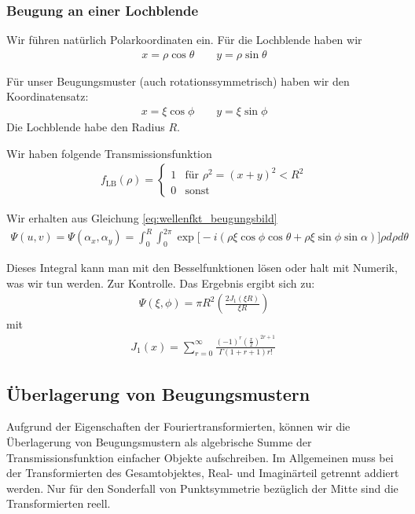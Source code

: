 \documentclass[a4paper]{article}
\begin{document}
\subsubsection{Beugung an einer Lochblende}
Wir führen natürlich Polarkoordinaten ein. Für die Lochblende haben wir
\begin{align}
x= \rho \cos \theta \qquad y = \rho \sin \theta
\end{align}

Für unser Beugungsmuster (auch rotationssymmetrisch) haben wir den Koordinatensatz:
\begin{align}
x= \xi \cos \phi \qquad y= \xi \sin \phi
\end{align}
Die Lochblende habe den Radius $R$.

Wir haben folgende Transmissionsfunktion 
\begin{align}
f_\text{LB}(\rho) = \begin{cases} 
1  &\text{für } \rho^2 = (x+y)^2 <  R^2 \\
0 & \text{sonst}\end{cases}
\label{eq:lochblende}
\end{align}

Wir erhalten aus Gleichung \ref{eq:wellenfkt_beugungsbild}
\begin{align}
\Psi(u,v)=\Psi(\alpha_x,\alpha_y) = \int_0^R \int_0^{2\pi} \exp\Big[ -i (\rho \xi \cos\phi\cos\theta + \rho\xi\sin\phi\sin\alpha) \Big] \rho d\rho d\theta
\end{align}

Dieses Integral kann man mit den Besselfunktionen lösen oder halt mit Numerik, was wir tun werden.
Zur Kontrolle. Das Ergebnis ergibt sich zu:
\begin{align}
\Psi (\xi,\phi ) = \pi R^2 \left( \frac{2J_1(\xi R)}{\xi R} \right)
\end{align}
mit 
\begin{align}
J_{1}(x)=\sum _{{r=0}}^{\infty }{\frac  {(-1)^{r}({\frac  {x}{2}})^{{2r+1 }}}{\Gamma (1 +r+1)r!}}\, 
\end{align}
\subsection{Überlagerung von Beugungsmustern}
Aufgrund der Eigenschaften der Fouriertransformierten, können wir die Überlagerung von Beugungsmustern als algebrische Summe der Transmissionsfunktion einfacher Objekte aufschreiben. Im Allgemeinen muss bei der Transformierten des Gesamtobjektes, Real- und Imaginärteil getrennt addiert werden. Nur für den Sonderfall von Punktsymmetrie bezüglich der Mitte sind die Transformierten reell. 
\end{document}
